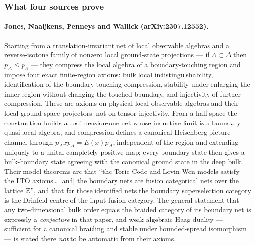 \subsubsection*{What four sources prove}

\paragraph{Jones, Naaijkens, Penneys and Wallick (arXiv:2307.12552).} Starting
from a translation-invariant net of local observable algebras and a
reverse-isotone family of nonzero local ground-state projections --- if
$\Lambda\subset\Delta$ then $p_\Delta\le p_\Lambda$ --- they compress the local
algebra of a boundary-touching region and impose four exact finite-region
axioms: bulk local indistinguishability, identification of the
boundary-touching compression, stability under enlarging the inner region
without changing the touched boundary, and injectivity of further compression.
These are axioms on physical local observable algebras and their local
ground-space projectors, not on tensor injectivity. From a half-space the
construction builds a codimension-one net whose inductive limit is a boundary
quasi-local algebra, and compression defines a canonical Heisenberg-picture
channel through $p_\Delta x p_\Delta=E(x)p_\Delta$, independent of the region
and extending uniquely to a unital completely positive map; every boundary
state then gives a bulk-boundary state agreeing with the canonical ground state
in the deep bulk. Their model theorems are that ``the Toric Code and Levin-Wen
models satisfy the LTO axioms\ldots{} [and] the boundary nets are fusion
categorical nets over the lattice $\mathbb{Z}$'', and that for those identified nets the
boundary superselection category is the Drinfeld centre of the input fusion
category. The general statement that any two-dimensional bulk order equals the
braided category of its boundary net is expressly a \emph{conjecture} in that
paper, and weak algebraic Haag duality --- sufficient for a canonical braiding
and stable under bounded-spread isomorphism --- is stated there \emph{not} to be
automatic from their axioms.

